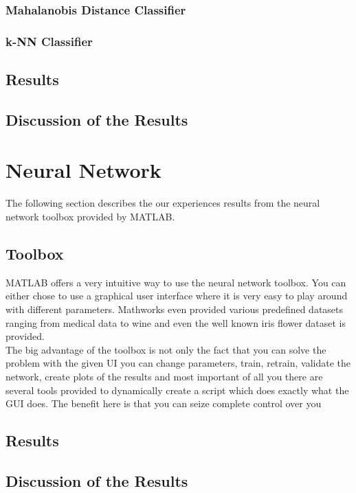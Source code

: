 \documentclass[subfigure,epsfig,fleqn,float,ausarbeitung]{scrartcl}
\begin{document}
\subsubsection{Mahalanobis Distance Classifier}

\subsubsection{k-NN Classifier}

\subsection{Results}

\subsection{Discussion of the Results}


\section{Neural Network}

The following section describes the our experiences results from the neural network toolbox provided by MATLAB.

\subsection{Toolbox}

MATLAB offers a very intuitive way to use the neural network toolbox. You can either chose to use a graphical user interface where it is very easy to play around with different parameters. Mathworks even provided various predefined datasets ranging from medical data to wine and even the well known iris flower dataset is provided. ~\\
The big advantage of the toolbox is not only the fact that you can solve the problem with the given UI you can change parameters, train, retrain, validate the network, create plots of the results and most important of all you there are several tools provided to dynamically create a script which does exactly what the GUI does. The benefit here is that you can seize complete control over you 

\subsection{Results}

\subsection{Discussion of the Results}
\end{document}
